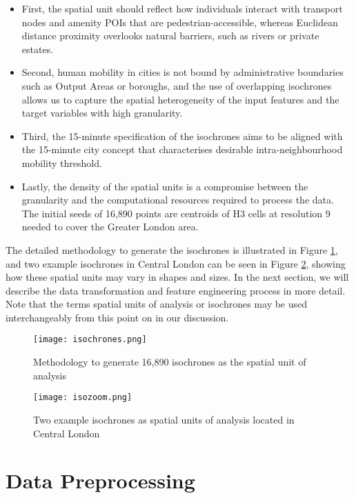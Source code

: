 \begin{itemize}
    \setlength\itemsep{0em}
    \item First, the spatial unit should reflect how individuals interact with transport nodes and amenity POIs that are pedestrian-accessible, whereas Euclidean distance proximity overlooks natural barriers, such as rivers or private estates. 
    \item Second, human mobility in cities is not bound by administrative boundaries such as Output Areas or boroughs, and the use of overlapping isochrones allows us to capture the spatial heterogeneity of the input features and the target variables with high granularity.
    \item Third, the 15-minute specification of the isochrones aims to be aligned with the 15-minute city concept that characterises desirable intra-neighbourhood mobility threshold.
    \item Lastly, the density of the spatial units is a compromise between the granularity and the computational resources required to process the data. The initial seeds of 16,890 points are centroids of H3 cells at resolution 9 needed to cover the Greater London area. 
\end{itemize}

The detailed methodology to generate the isochrones is illustrated in Figure \ref{fig:isochrones}, and two example isochrones in Central London can be seen in Figure \ref{fig:isozoom}, showing how these spatial units may vary in shapes and sizes. In the next section, we will describe the data transformation and feature engineering process in more detail. Note that the terms spatial units of analysis or isochrones may be used interchangeably from this point on in our discussion.

\begin{figure}[ht]
    \centering
    \texttt{[image: isochrones.png]}
    \captionsetup{justification=centering}
    \caption{Methodology to generate 16,890 isochrones as the spatial unit of analysis}
    \label{fig:isochrones}
\end{figure}

\begin{figure}[!ht]
    \centering
    \texttt{[image: isozoom.png]}
    \caption{Two example isochrones as spatial units of analysis located in Central London}
    \label{fig:isozoom}
\end{figure}


\pagebreak[4] %
\section{Data Preprocessing}
